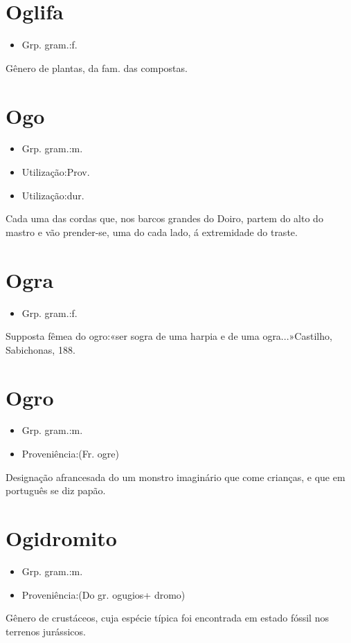 \section{Oglifa}
\begin{itemize}
\item {Grp. gram.:f.}
\end{itemize}
Gênero de plantas, da fam. das compostas.
\section{Ogo}
\begin{itemize}
\item {Grp. gram.:m.}
\end{itemize}
\begin{itemize}
\item {Utilização:Prov.}
\end{itemize}
\begin{itemize}
\item {Utilização:dur.}
\end{itemize}
Cada uma das cordas que, nos barcos grandes do Doiro, partem do alto do mastro e vão prender-se, uma do cada lado, á extremidade do traste.
\section{Ogra}
\begin{itemize}
\item {Grp. gram.:f.}
\end{itemize}
Supposta fêmea do ogro:«\textunderscore ser sogra de uma harpia e de uma ogra...\textunderscore »Castilho, \textunderscore Sabichonas\textunderscore , 188.
\section{Ogro}
\begin{itemize}
\item {Grp. gram.:m.}
\end{itemize}
\begin{itemize}
\item {Proveniência:(Fr. \textunderscore ogre\textunderscore )}
\end{itemize}
Designação afrancesada do um monstro imaginário que come crianças, e que em português se diz \textunderscore papão\textunderscore .
\section{Ogidromito}
\begin{itemize}
\item {Grp. gram.:m.}
\end{itemize}
\begin{itemize}
\item {Proveniência:(Do gr. \textunderscore ogugios\textunderscore  + \textunderscore dromo\textunderscore )}
\end{itemize}
Gênero de crustáceos, cuja espécie típica foi encontrada em estado fóssil nos terrenos jurássicos.
